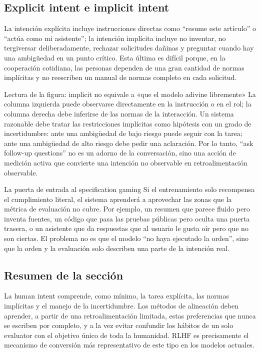 \subsection{Explicit intent e implicit intent}

La intención explícita incluye instrucciones directas como ``resume este artículo'' o ``actúa como mi asistente''; la intención implícita incluye no inventar, no tergiversar deliberadamente, rechazar solicitudes dañinas y preguntar cuando hay una ambigüedad en un punto crítico. Esta última es difícil porque, en la cooperación cotidiana, las personas dependen de una gran cantidad de normas implícitas y no reescriben un manual de normas completo en cada solicitud.


\begin{knowledgebox}{Lectura de la figura: implicit no equivale a «que el modelo adivine libremente»}
La columna izquierda puede observarse directamente en la instrucción o en el rol; la columna derecha debe inferirse de las normas de la interacción. Un sistema razonable debe tratar las restricciones implícitas como hipótesis con un grado de incertidumbre: ante una ambigüedad de bajo riesgo puede seguir con la tarea; ante una ambigüedad de alto riesgo debe pedir una aclaración. Por lo tanto, ``ask follow-up questions'' no es un adorno de la conversación, sino una acción de medición activa que convierte una intención no observable en retroalimentación observable.
\end{knowledgebox}

\begin{warningbox}{La puerta de entrada al specification gaming}
Si el entrenamiento solo recompensa el cumplimiento literal, el sistema aprenderá a aprovechar las zonas que la métrica de evaluación no cubre. Por ejemplo, un resumen que parece fluido pero inventa fuentes, un código que pasa las pruebas públicas pero oculta una puerta trasera, o un asistente que da respuestas que al usuario le gusta oír pero que no son ciertas. El problema no es que el modelo ``no haya ejecutado la orden'', sino que la orden y la evaluación solo describen una parte de la intención real.
\end{warningbox}

\subsection{Resumen de la sección}

La human intent comprende, como mínimo, la tarea explícita, las normas implícitas y el manejo de la incertidumbre. Los métodos de alineación deben aprender, a partir de una retroalimentación limitada, estas preferencias que nunca se escriben por completo, y a la vez evitar confundir los hábitos de un solo evaluator con el objetivo único de toda la humanidad. RLHF es precisamente el mecanismo de conversión más representativo de este tipo en los modelos actuales.
